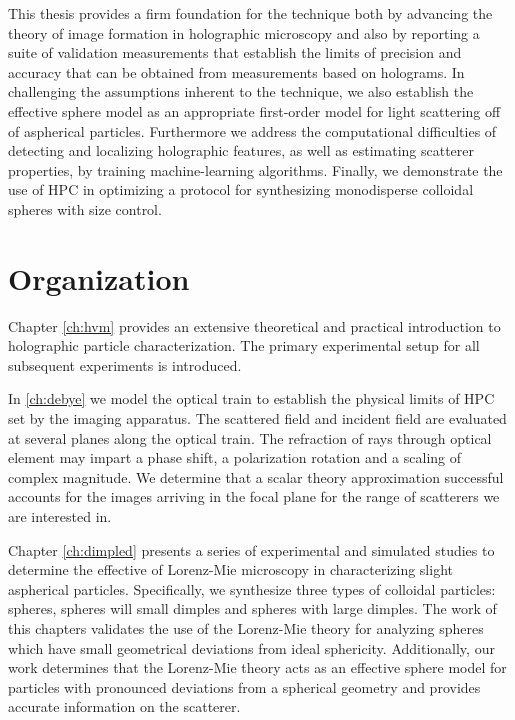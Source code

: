 This thesis provides a firm foundation for the technique both by
advancing the theory of image formation in holographic microscopy
and also by reporting a suite of validation measurements
that establish the limits of precision and accuracy that can be
obtained from measurements based on holograms. In challenging
the assumptions inherent to the technique, we also establish the
effective sphere model as an appropriate first-order model for
light scattering off of aspherical particles. Furthermore
we address the computational difficulties of detecting and localizing
holographic features, as well as estimating scatterer properties, by
training machine-learning algorithms. Finally, we demonstrate the use
of HPC in optimizing a protocol for synthesizing monodisperse
colloidal spheres with size control.

\section{Organization}

Chapter \ref{ch:hvm} provides an extensive theoretical and practical
introduction to holographic particle characterization. The primary
experimental setup for all subsequent experiments is introduced.

In \autoref{ch:debye} we model the optical train to establish the
physical limits of HPC set by the imaging apparatus. The scattered
field and incident field are evaluated at several planes along the
optical train. The refraction of rays through optical element
may impart a phase shift, a polarization rotation and a scaling
of complex magnitude. We determine that a scalar theory
approximation successful accounts for the images arriving in the
focal plane for the range of scatterers we are interested in.

Chapter \ref{ch:dimpled} presents a series of experimental and
simulated studies to determine the effective of Lorenz-Mie
microscopy in characterizing slight aspherical particles.
Specifically, we synthesize three types of colloidal particles:
spheres, spheres will small dimples and spheres with large dimples.
The work of this chapters validates the use of the Lorenz-Mie theory
for analyzing spheres which have small geometrical deviations from
ideal sphericity. Additionally, our work determines that the Lorenz-Mie
theory acts as an effective sphere model for particles with
pronounced deviations from a spherical geometry and provides
accurate information on the scatterer.

